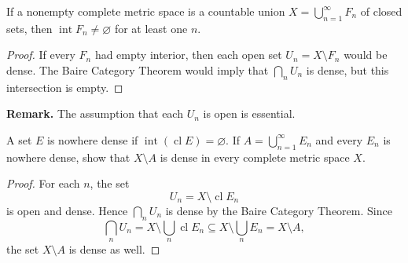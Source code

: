 \begin{cor}
If a nonempty complete metric space is a countable union
$X=\bigcup_{n=1}^\infty F_n$ of closed sets, then
$\operatorname{int}F_n\neq\varnothing$ for at least one $n$.
\end{cor}

\begin{proof}
If every $F_n$ had empty interior, then each open set
$U_n=X\setminus F_n$ would be dense. The Baire Category Theorem would imply
that $\bigcap_nU_n$ is dense, but this intersection is empty.
\end{proof}

\textbf{Remark.} The assumption that each $U_n$ is open is essential.

\begin{ex}
A set $E$ is nowhere dense if
$\operatorname{int}(\operatorname{cl}E)=\varnothing$. If
$A=\bigcup_{n=1}^\infty E_n$ and every $E_n$ is nowhere dense, show that
$X\setminus A$ is dense in every complete metric space $X$.
\end{ex}

\begin{proof}
For each $n$, the set
\[
U_n=X\setminus\operatorname{cl}E_n
\]
is open and dense. Hence $\bigcap_nU_n$ is dense by the Baire Category
Theorem. Since
\[
\bigcap_nU_n
=X\setminus\bigcup_n\operatorname{cl}E_n
\subseteq X\setminus\bigcup_nE_n=X\setminus A,
\]
the set $X\setminus A$ is dense as well.
\end{proof}
